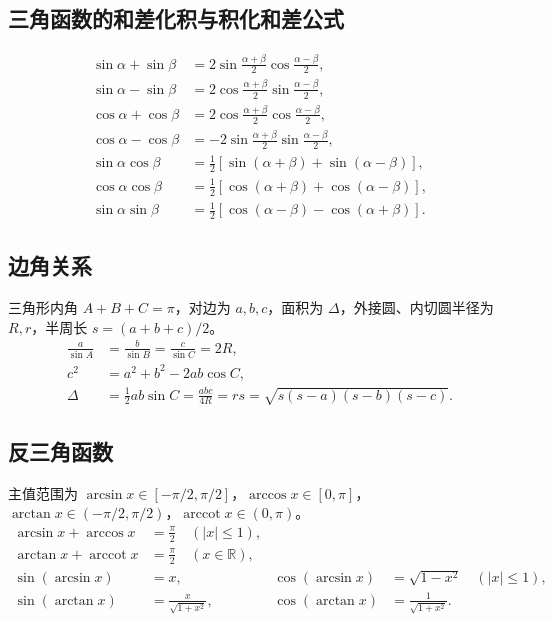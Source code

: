 \documentclass[../main.tex]{subfiles}
\begin{document}
\subsection{三角函数的和差化积与积化和差公式}
\begin{align*}
\sin\alpha+\sin\beta&=2\sin\frac{\alpha+\beta}2\cos\frac{\alpha-\beta}2,\\
\sin\alpha-\sin\beta&=2\cos\frac{\alpha+\beta}2\sin\frac{\alpha-\beta}2,\\
\cos\alpha+\cos\beta&=2\cos\frac{\alpha+\beta}2\cos\frac{\alpha-\beta}2,\\
\cos\alpha-\cos\beta&=-2\sin\frac{\alpha+\beta}2\sin\frac{\alpha-\beta}2,\\
\sin\alpha\cos\beta&=\tfrac12[\sin(\alpha+\beta)+\sin(\alpha-\beta)],\\
\cos\alpha\cos\beta&=\tfrac12[\cos(\alpha+\beta)+\cos(\alpha-\beta)],\\
\sin\alpha\sin\beta&=\tfrac12[\cos(\alpha-\beta)-\cos(\alpha+\beta)].
\end{align*}
\subsection{边角关系}
三角形内角 $A+B+C=\pi$，对边为 $a,b,c$，面积为 $\Delta$，外接圆、内切圆半径为 $R,r$，半周长 $s=(a+b+c)/2$。
\begin{align*}
\frac a{\sin A}&=\frac b{\sin B}=\frac c{\sin C}=2R,\\
c^2&=a^2+b^2-2ab\cos C,\\
\Delta&=\tfrac12ab\sin C=\frac{abc}{4R}=rs=\sqrt{s(s-a)(s-b)(s-c)}.
\end{align*}
\subsection{反三角函数}
主值范围为 $\arcsin x\in[-\pi/2,\pi/2]$，$\arccos x\in[0,\pi]$，$\arctan x\in(-\pi/2,\pi/2)$，$\operatorname{arccot}x\in(0,\pi)$。
\begin{align*}
\arcsin x+\arccos x&=\frac\pi2\quad(|x|\le1),\\
\arctan x+\operatorname{arccot}x&=\frac\pi2\quad(x\in\mathbb R),\\
\sin(\arcsin x)&=x, & \cos(\arcsin x)&=\sqrt{1-x^2}\quad(|x|\le1),\\
\sin(\arctan x)&=\frac{x}{\sqrt{1+x^2}}, & \cos(\arctan x)&=\frac1{\sqrt{1+x^2}}.
\end{align*}
\end{document}
